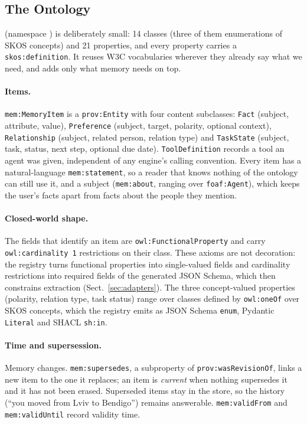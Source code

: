 \subsection{The \memcore Ontology}

\memcore (namespace \memns) is deliberately small: 14 classes (three of them enumerations of SKOS concepts) and 21 properties, and every
property carries a \texttt{skos:definition}. It reuses W3C vocabularies wherever they already
say what we need, and adds only what memory needs on top.

\paragraph{Items.} \texttt{mem:MemoryItem} is a \texttt{prov:Entity} with four content subclasses:
\texttt{Fact} (subject, attribute, value), \texttt{Preference} (subject, target, polarity, optional
context), \texttt{Relationship} (subject, related person, relation type) and \texttt{TaskState}
(subject, task, status, next step, optional due date). \texttt{ToolDefinition} records a tool an
agent was given, independent of any engine's calling convention. Every item has a natural-language
\texttt{mem:statement}, so a reader that knows nothing of the ontology can still use it, and a
subject (\texttt{mem:about}, ranging over \texttt{foaf:Agent}), which keeps the user's facts apart
from facts about the people they mention.

\paragraph{Closed-world shape.} The fields that identify an item are \texttt{owl:FunctionalProperty}
and carry \texttt{owl:cardinality 1} restrictions on their class. These axioms are not decoration:
the registry turns functional properties into single-valued fields and cardinality restrictions
into required fields of the generated JSON Schema, which then constrains extraction
(Sect.~\ref{sec:adapters}). The three concept-valued properties (polarity, relation type, task
status) range over classes defined by \texttt{owl:oneOf} over SKOS concepts, which the registry
emits as JSON Schema \texttt{enum}, Pydantic \texttt{Literal} and SHACL \texttt{sh:in}.

\paragraph{Time and supersession.} Memory changes. \texttt{mem:supersedes}, a subproperty of
\texttt{prov:wasRevisionOf}, links a new item to the one it replaces; an item is \emph{current}
when nothing supersedes it and it has not been erased. Superseded items stay in the store, so
the history (``you moved from Lviv to Bendigo'') remains answerable. \texttt{mem:validFrom} and
\texttt{mem:validUntil} record validity time.

